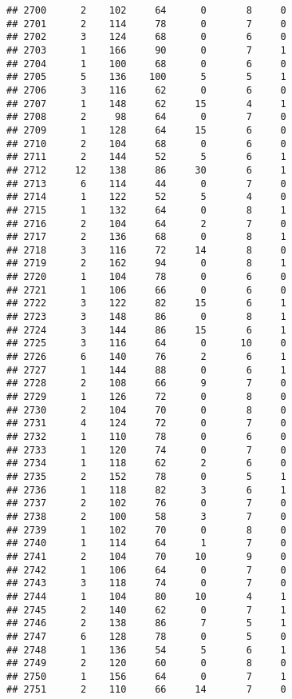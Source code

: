 \documentclass[
]{article}
\begin{document}
\begin{verbatim}
## 2700      2    102     64      0       8     0
## 2701      2    114     78      0       7     0
## 2702      3    124     68      0       6     0
## 2703      1    166     90      0       7     1
## 2704      1    100     68      0       6     0
## 2705      5    136    100      5       5     1
## 2706      3    116     62      0       6     0
## 2707      1    148     62     15       4     1
## 2708      2     98     64      0       7     0
## 2709      1    128     64     15       6     0
## 2710      2    104     68      0       6     0
## 2711      2    144     52      5       6     1
## 2712     12    138     86     30       6     1
## 2713      6    114     44      0       7     0
## 2714      1    122     52      5       4     0
## 2715      1    132     64      0       8     1
## 2716      2    104     64      2       7     0
## 2717      2    136     68      0       8     1
## 2718      3    116     72     14       8     0
## 2719      2    162     94      0       8     1
## 2720      1    104     78      0       6     0
## 2721      1    106     66      0       6     0
## 2722      3    122     82     15       6     1
## 2723      3    148     86      0       8     1
## 2724      3    144     86     15       6     1
## 2725      3    116     64      0      10     0
## 2726      6    140     76      2       6     1
## 2727      1    144     88      0       6     1
## 2728      2    108     66      9       7     0
## 2729      1    126     72      0       8     0
## 2730      2    104     70      0       8     0
## 2731      4    124     72      0       7     0
## 2732      1    110     78      0       6     0
## 2733      1    120     74      0       7     0
## 2734      1    118     62      2       6     0
## 2735      2    152     78      0       5     1
## 2736      1    118     82      3       6     1
## 2737      2    102     76      0       7     0
## 2738      2    100     58      3       7     0
## 2739      1    102     70      0       8     0
## 2740      1    114     64      1       7     0
## 2741      2    104     70     10       9     0
## 2742      1    106     64      0       7     0
## 2743      3    118     74      0       7     0
## 2744      1    104     80     10       4     1
## 2745      2    140     62      0       7     1
## 2746      2    138     86      7       5     1
## 2747      6    128     78      0       5     0
## 2748      1    136     54      5       6     1
## 2749      2    120     60      0       8     0
## 2750      1    156     64      0       7     1
## 2751      2    110     66     14       7     0

\end{verbatim}
\end{document}
